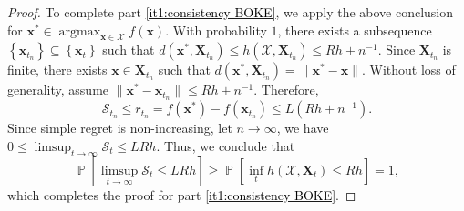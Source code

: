 \documentclass[11pt,en]{elegantpaper}
\newcommand{\domain}{\mathcal{X}}
\newcommand{\X}{\bm{X}}
\newcommand{\x}{\bm{x}}
\newcommand{\simregret}{\mathcal{S}}
\newcommand{\1}{\mathds{1}}
\newcommand{\set}[1]{\left\{#1\right\}}
\DeclareMathOperator*{\Prob}{\mathbb{P}}
\DeclareMathOperator*{\argmax}{argmax}
\newcommand{\itref}[1]{\hyperref[#1]{\textcolor{black}{\ref*{#1}}}}
\begin{document}
\begin{proof}
    To complete part \itref{it1:consistency BOKE}, we apply the above conclusion for $\x^{\ast} \in \argmax_{\x \in \domain} f(\x)$. With probability $1$, there exists a subsequence $\set{\x_{t_n}} \subseteq \set{\x_t}$ such that $d(\x^{\ast}, \X_{t_n}) \le h(\domain, \X_{t_n}) \le R h + n^{-1}$. Since $\X_{t_n}$ is finite, there exists $\x \in \X_{t_n}$ such that $d(\x^{\ast}, \X_{t_n}) = \| \x^{\ast} - \x \|$. Without loss of generality, assume $\| \x^{\ast} - \x_{t_n} \| \le R h + n^{-1}$. Therefore,
    \[
        \simregret_{t_n} \le r_{t_n} = f(\x^{\ast}) - f(\x_{t_n}) \le L(Rh + n^{-1}).
    \]
    Since simple regret is non-increasing, let $n \to \infty$, we have $0 \le \limsup_{t \to \infty} \simregret_t \le L R h$. Thus, we conclude that
    \[
        \Prob\left[ \limsup_{t \to \infty} \simregret_t \le L R h \right] 
        \ge \Prob\left[ \inf_{t} h(\domain, \X_t) \le R h \right] = 1,
    \]
    which completes the proof for part \itref{it1:consistency BOKE}.



\end{proof}
\end{document}
